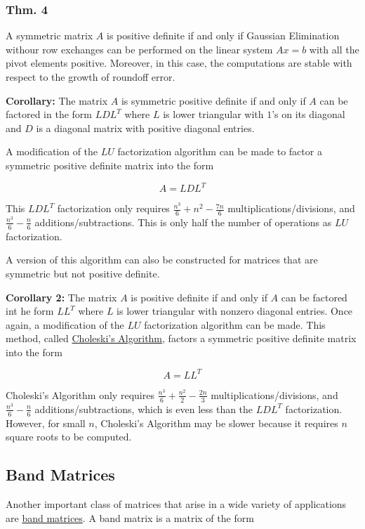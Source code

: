 \documentclass[12pt]{article}
\begin{document}
\subsubsection{Thm. 4}

A symmetric matrix $A$ is positive definite if and only if Gaussian Elimination
withour row exchanges can be performed on the linear system $Ax=b$ with
all the pivot elements positive. Moreover, in this case, the computations are
stable with respect to the growth of roundoff error.

\textbf{Corollary:} The matrix $A$ is symmetric positive definite if and only if
$A$ can be factored in the form $LDL^T$ where $L$ is lower triangular with $1$'s
on its diagonal and $D$ is a diagonal matrix with positive diagonal entries.

A modification of the $LU$ factorization algorithm can be made to factor a
symmetric positive definite matrix into the form

\begin{equation*}
  A = LDL^T
\end{equation*}

This $LDL^T$ factorization only requires $\frac{n^3}{6}+n^2 - \frac{7n}{6}$ 
multiplications/divisions, and $\frac{n^3}{6}-\frac{n}{6}$ additions/subtractions.
This is only half the number of operations as $LU$ factorization.

A version of this algorithm can also be constructed for matrices that are
symmetric but not positive definite.

\textbf{Corollary 2:} The matrix $A$ is positive definite if and only if $A$ can
be factored int he form $LL^T$ where $L$ is lower triangular with nonzero
diagonal entries. Once again, a modification of the $LU$ factorization algorithm
can be made. This method, called \uline{Choleski's Algorithm}, factors a
symmetric positive definite matrix into the form

\begin{equation*}
  A = LL^T
\end{equation*}

Choleski's Algorithm only requires $\frac{n^3}{6} + \frac{n^2}{2} - \frac{2n}{3}$
multiplications/divisions, and $\frac{n^3}{6}-\frac{n}{6}$ additions/subtractions,
which is even less than the $LDL^T$ factorization. However, for small $n$,
Choleski's Algorithm may be slower because it requires $n$ square roots to
be computed.

\subsection{Band Matrices}

Another important class of matrices that arise in a wide variety of applications
are \uline{band matrices}. A band matrix is a matrix of the form
 
\end{document}
